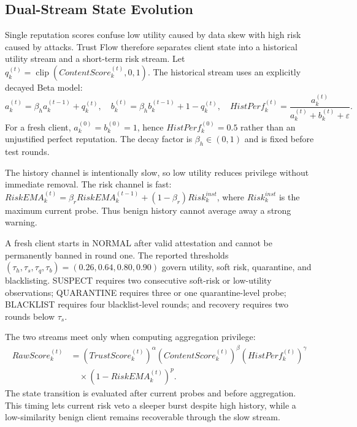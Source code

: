 \documentclass[runningheads,orivec]{llncs}
\begin{document}
\subsection{Dual-Stream State Evolution}

Single reputation scores confuse low utility caused by data skew with high risk caused by attacks. Trust Flow therefore separates client state into a historical utility stream and a short-term risk stream. Let $q_k^{(t)}=\operatorname{clip}(ContentScore_k^{(t)},0,1)$. The historical stream uses an explicitly decayed Beta model:
\begin{equation}
    a_k^{(t)}=\beta_h a_k^{(t-1)}+q_k^{(t)},\quad
    b_k^{(t)}=\beta_h b_k^{(t-1)}+1-q_k^{(t)},\quad
    HistPerf_k^{(t)}=\frac{a_k^{(t)}}{a_k^{(t)}+b_k^{(t)}+\varepsilon}.
\end{equation}
For a fresh client, $a_k^{(0)}=b_k^{(0)}=1$, hence $HistPerf_k^{(0)}=0.5$ rather than an unjustified perfect reputation. The decay factor is $\beta_h\in(0,1)$ and is fixed before test rounds.

The history channel is intentionally slow, so low utility reduces privilege without immediate removal. The risk channel is fast: $RiskEMA_k^{(t)}=\beta_rRiskEMA_k^{(t-1)}+(1-\beta_r)Risk_k^{inst}$, where $Risk_k^{inst}$ is the maximum current probe. Thus benign history cannot average away a strong warning.

A fresh client starts in NORMAL after valid attestation and cannot be permanently banned in round one. The reported thresholds $(\tau_h,\tau_s,\tau_q,\tau_b)=(0.26,0.64,0.80,0.90)$ govern utility, soft risk, quarantine, and blacklisting. SUSPECT requires two consecutive soft-risk or low-utility observations; QUARANTINE requires three or one quarantine-level probe; BLACKLIST requires four blacklist-level rounds; and recovery requires two rounds below $\tau_s$.

The two streams meet only when computing aggregation privilege:
\begin{align}
    RawScore_k^{(t)} & = (TrustScore_k^{(t)})^\alpha(ContentScore_k^{(t)})^\beta
    (HistPerf_k^{(t)})^\gamma \nonumber                      \\
               & \quad \times (1-RiskEMA_k^{(t)})^p .
\end{align}
The state transition is evaluated after current probes and before aggregation. This timing lets current risk veto a sleeper burst despite high history, while a low-similarity benign client remains recoverable through the slow stream.
\end{document}
